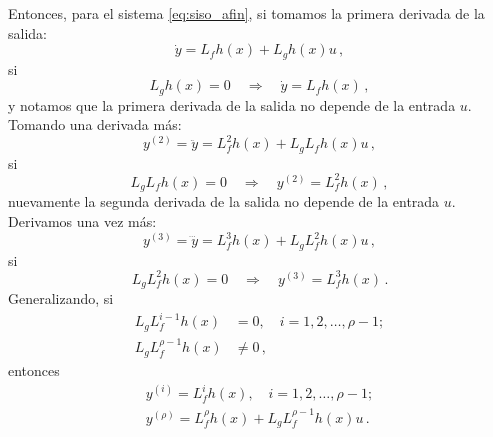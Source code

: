 Entonces, para el sistema \ref{eq:siso_afin}, si tomamos la primera derivada de la salida:
\begin{equation*}
	\dot{y} = L_fh(x) + L_gh(x)u \, ,
\end{equation*}
si
\begin{equation*}
	L_gh(x) = 0 \quad \Rightarrow \quad \dot{y} = L_fh(x) \, ,
\end{equation*}
y notamos que la primera derivada de la salida no depende de la entrada $u$. Tomando una derivada más:
\begin{equation*}
	y^{(2)} = \ddot{y} = L_f^2h(x) + L_g L_fh(x)u \, ,
\end{equation*}
si
\begin{equation*}
	L_g L_fh(x) = 0 \quad \Rightarrow \quad y^{(2)}  = L_f^2h(x) \, ,
\end{equation*}
nuevamente la segunda derivada de la salida no depende de la entrada $u$. Derivamos una vez más:
\begin{equation*}
	y^{(3)} = \dddot{y} = L_f^3h(x) + L_g L_f^2h(x)u \, ,
\end{equation*}
si
\begin{equation*}
	L_g L_f^2h(x) = 0 \quad \Rightarrow \quad y^{(3)} = L_f^3h(x) \, .
\end{equation*}
Generalizando, si
\begin{equation*}
	\begin{aligned}
		L_g L_f^{i-1} h(x)    & = 0, \quad i = 1, 2, \ldots, \rho-1; \\
		L_g L_f^{\rho-1} h(x) & \neq 0 \, ,
	\end{aligned}
\end{equation*}
entonces
\begin{equation*}
	\begin{aligned}
		y^{(i)} = L_f^i h(x), \quad i = 1, 2, \ldots, \rho-1; \\
		y^{(\rho)} = L_f^\rho h(x) + L_g L_f^{\rho-1} h(x)u \, .
	\end{aligned}
\end{equation*}


